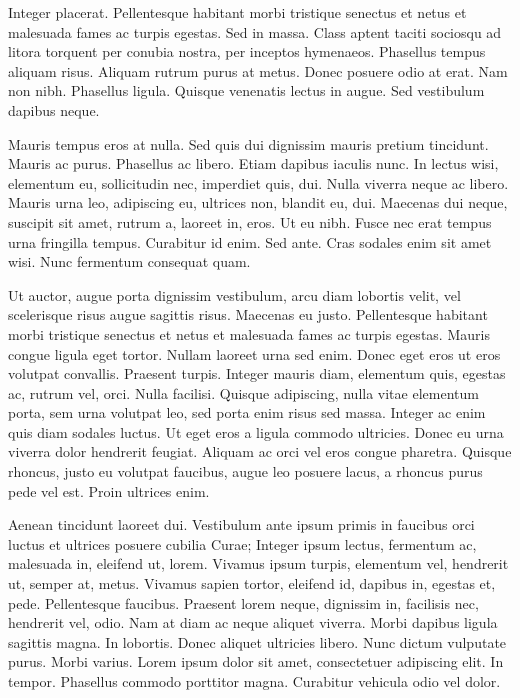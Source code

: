 \documentclass{article}
\begin{document}
Integer placerat. Pellentesque habitant morbi tristique senectus et netus et
malesuada fames ac turpis egestas. Sed in massa. Class aptent taciti sociosqu
ad litora torquent per conubia nostra, per inceptos hymenaeos. Phasellus tempus
aliquam risus. Aliquam rutrum purus at metus. Donec posuere odio at erat. Nam
non nibh. Phasellus ligula. Quisque venenatis lectus in augue. Sed vestibulum
dapibus neque.

Mauris tempus eros at nulla. Sed quis dui dignissim mauris pretium
tincidunt. Mauris ac purus. Phasellus ac libero. Etiam dapibus iaculis nunc. In
lectus wisi, elementum eu, sollicitudin nec, imperdiet quis, dui. Nulla viverra
neque ac libero. Mauris urna leo, adipiscing eu, ultrices non, blandit eu, dui.
Maecenas dui neque, suscipit sit amet, rutrum a, laoreet in, eros. Ut eu nibh.
Fusce nec erat tempus urna fringilla tempus. Curabitur id enim. Sed ante. Cras
sodales enim sit amet wisi. Nunc fermentum consequat quam.

Ut auctor, augue porta dignissim vestibulum, arcu diam lobortis velit, vel
scelerisque risus augue sagittis risus. Maecenas eu justo. Pellentesque
habitant morbi tristique senectus et netus et malesuada fames ac turpis
egestas. Mauris congue ligula eget tortor. Nullam laoreet urna sed enim. Donec
eget eros ut eros volutpat convallis. Praesent turpis. Integer mauris diam,
elementum quis, egestas ac, rutrum vel, orci. Nulla facilisi. Quisque
adipiscing, nulla
vitae elementum porta, sem urna volutpat leo, sed porta enim risus sed massa.
Integer ac enim quis diam sodales luctus. Ut eget eros a ligula commodo
ultricies. Donec eu urna viverra dolor hendrerit feugiat. Aliquam ac orci vel
eros congue pharetra. Quisque rhoncus, justo eu volutpat faucibus, augue leo
posuere lacus, a rhoncus purus pede vel est. Proin ultrices enim.

Aenean tincidunt laoreet dui. Vestibulum ante ipsum primis in faucibus orci
luctus et ultrices posuere cubilia Curae; Integer ipsum lectus, fermentum ac,
malesuada in, eleifend ut, lorem. Vivamus ipsum turpis, elementum vel,
hendrerit ut, semper at, metus. Vivamus sapien tortor, eleifend id, dapibus in,
egestas et, pede. Pellentesque faucibus. Praesent lorem neque, dignissim in,
facilisis nec, hendrerit vel, odio. Nam at diam ac neque aliquet viverra. Morbi
dapibus ligula sagittis magna. In lobortis. Donec aliquet ultricies libero.
Nunc dictum vulputate purus. Morbi varius. Lorem ipsum dolor sit amet,
consectetuer adipiscing elit. In tempor. Phasellus commodo porttitor magna.
Curabitur vehicula odio vel dolor.
\end{document}
